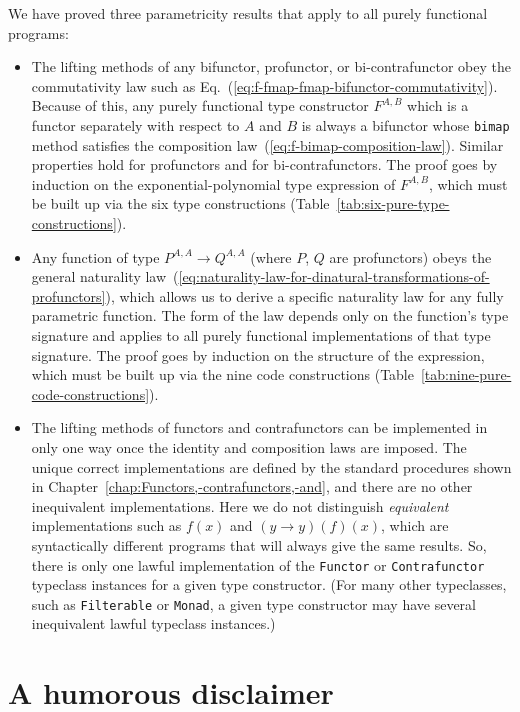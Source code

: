We have proved three parametricity results that apply to all purely
functional programs:
\begin{itemize}
\item The lifting methods of any bifunctor, profunctor, or bi-contrafunctor
obey the commutativity law such as Eq.~(\ref{eq:f-fmap-fmap-bifunctor-commutativity}).
Because of this, any purely functional type constructor $F^{A,B}$
which is a functor separately with respect to $A$ and $B$ is always
a bifunctor whose \lstinline!bimap! method satisfies the composition
law~(\ref{eq:f-bimap-composition-law}). Similar properties hold
for profunctors and for bi-contrafunctors. The proof goes by induction
on the exponential-polynomial type expression of $F^{A,B}$, which
must be built up via the six type constructions (Table~\ref{tab:six-pure-type-constructions}).
\item Any function of type $P^{A,A}\rightarrow Q^{A,A}$ (where $P$, $Q$
are profunctors) obeys the general naturality law~(\ref{eq:naturality-law-for-dinatural-transformations-of-profunctors}),
which allows us to derive a specific naturality law for any fully
parametric function. The form of the law depends only on the function's
type signature and applies to all purely functional implementations
of that type signature. The proof goes by induction on the structure
of the expression, which must be built up via the nine code constructions
(Table~\ref{tab:nine-pure-code-constructions}).
\item The lifting methods of functors and contrafunctors can be implemented
in only one way once the identity and composition laws are imposed.
The unique correct implementations are defined by the standard procedures
shown in Chapter~\ref{chap:Functors,-contrafunctors,-and}, and there
are no other inequivalent implementations. Here we do not distinguish
\emph{equivalent} implementations such as $f(x)$ and $(y\rightarrow y)(f)(x)$,
which are syntactically different programs that will always give the
same results. So, there is only one lawful implementation of the \lstinline!Functor!
or \lstinline!Contrafunctor! typeclass instances for a given type
constructor. (For many other typeclasses, such as \lstinline!Filterable!
or \lstinline!Monad!, a given type constructor may have several inequivalent
lawful typeclass instances.)
\end{itemize}

\chapter{A humorous disclaimer}

